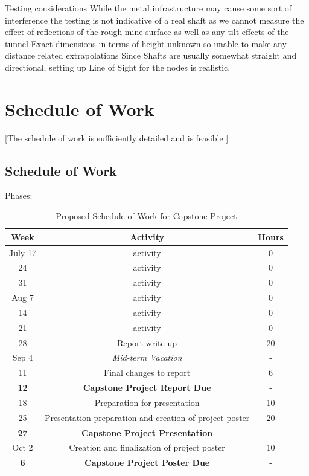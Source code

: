 \documentclass[a4paper,twoside,12pt]{report}
\begin{document}
Testing considerations
While the metal infrastructure may cause some sort of interference the testing is not indicative of a real shaft as we cannot measure the effect of reflections of the rough mine surface as well as any tilt effects of the tunnel
Exact dimensions in terms of height unknown so unable to make any distance related extrapolations
Since Shafts are usually somewhat straight and directional, setting up Line of Sight for the nodes is realistic.

\chapter{Schedule of Work}
[The schedule of work is sufficiently detailed
and is feasible
]
\section{Schedule of Work}
Phases:


\begin{table}[p]
	\centering
	\caption{Proposed Schedule of Work for Capstone Project}
	\label{tab:workScheduleTable}
\begin{tabular}{ccc}
	\hline
	Week & Activity & Hours\\
	\hline\hline 
	July 17 & activity & 0 \\ 
	24 & activity & 0 \\ 
    31 & activity & 0 \\ 
    \hline
    Aug 7 & activity & 0 \\ 
    14 & activity & 0 \\ 
    21 & activity & 0 \\ 
    28 & Report write-up & 20 \\ 
    \hline
    Sep 4 & \textit{Mid-term Vacation} & - \\ 
    11 & Final changes to report & 6 \\ 
    \textbf{12} & \textbf{Capstone Project Report Due} & - \\ 
    18 & Preparation for presentation & 10 \\
    25 & Presentation preparation and creation of project poster & 20 \\
    \textbf{27} & \textbf{Capstone Project Presentation} & - \\ 
	\hline
    Oct 2 & Creation and finalization of project poster & 10 \\
    \textbf{6} & \textbf{Capstone Project Poster Due} & - \\ 
    \hline
\end{tabular} 
\end{table}

\nocite{*}

\end{document}
